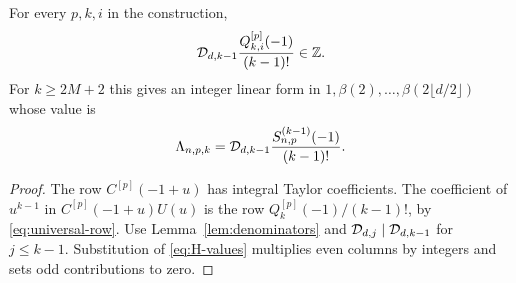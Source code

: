 \begin{corollary}\label{cor:integer}
For every $p,k,i$ in the construction,
\[
 \mathcal D_{d,k-1}\frac{Q_{k,i}^{[p]}(-1)}{(k-1)!}\in\mathbb Z.
\]
For $k\geq2M+2$ this gives an integer linear form in
$1,\beta(2),\ldots,\beta(2\lfloor d/2\rfloor)$ whose value is
\begin{equation}\label{eq:integer-form}
 \Lambda_{n,p,k}
       =\mathcal D_{d,k-1}\frac{S_{n,p}^{(k-1)}(-1)}{(k-1)!}.
\end{equation}
\end{corollary}

\begin{proof}
The row $C^{[p]}(-1+u)$ has integral Taylor coefficients.
The coefficient of $u^{k-1}$ in $C^{[p]}(-1+u)U(u)$ is the row
$Q_k^{[p]}(-1)/(k-1)!$, by \eqref{eq:universal-row}.
Use Lemma~\ref{lem:denominators} and
$\mathcal D_{d,j}\mid\mathcal D_{d,k-1}$ for $j\leq k-1$.
Substitution of \eqref{eq:H-values} multiplies even columns by integers
and sets odd contributions to zero.
\end{proof}

